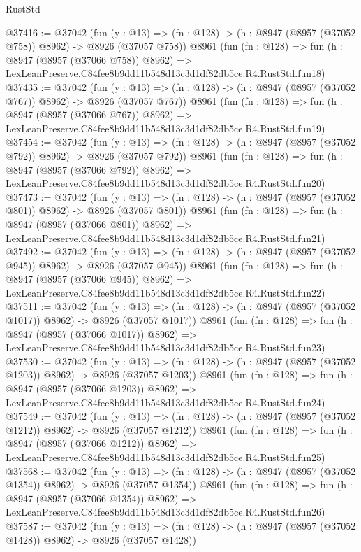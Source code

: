 \begin{lexlean}{RustStd}
\begin{coremodule}
@37416 := @37042
    (fun (y : @13) => (fn : @128) -> (h : @8947 (@8957 (@37052 @758)) @8962) -> @8926 (@37057 @758))
    @8961
    (fun (fn : @128) =>
    fun (h : @8947 (@8957 (@37066 @758)) @8962) =>
    LexLeanPreserve.C84fee8b9dd11b548d13c3d1df82db5ce.R4.RustStd.fun18)
@37435 := @37042
    (fun (y : @13) => (fn : @128) -> (h : @8947 (@8957 (@37052 @767)) @8962) -> @8926 (@37057 @767))
    @8961
    (fun (fn : @128) =>
    fun (h : @8947 (@8957 (@37066 @767)) @8962) =>
    LexLeanPreserve.C84fee8b9dd11b548d13c3d1df82db5ce.R4.RustStd.fun19)
@37454 := @37042
    (fun (y : @13) => (fn : @128) -> (h : @8947 (@8957 (@37052 @792)) @8962) -> @8926 (@37057 @792))
    @8961
    (fun (fn : @128) =>
    fun (h : @8947 (@8957 (@37066 @792)) @8962) =>
    LexLeanPreserve.C84fee8b9dd11b548d13c3d1df82db5ce.R4.RustStd.fun20)
@37473 := @37042
    (fun (y : @13) => (fn : @128) -> (h : @8947 (@8957 (@37052 @801)) @8962) -> @8926 (@37057 @801))
    @8961
    (fun (fn : @128) =>
    fun (h : @8947 (@8957 (@37066 @801)) @8962) =>
    LexLeanPreserve.C84fee8b9dd11b548d13c3d1df82db5ce.R4.RustStd.fun21)
@37492 := @37042
    (fun (y : @13) => (fn : @128) -> (h : @8947 (@8957 (@37052 @945)) @8962) -> @8926 (@37057 @945))
    @8961
    (fun (fn : @128) =>
    fun (h : @8947 (@8957 (@37066 @945)) @8962) =>
    LexLeanPreserve.C84fee8b9dd11b548d13c3d1df82db5ce.R4.RustStd.fun22)
@37511 := @37042
    (fun (y : @13) =>
    (fn : @128) -> (h : @8947 (@8957 (@37052 @1017)) @8962) -> @8926 (@37057 @1017))
    @8961
    (fun (fn : @128) =>
    fun (h : @8947 (@8957 (@37066 @1017)) @8962) =>
    LexLeanPreserve.C84fee8b9dd11b548d13c3d1df82db5ce.R4.RustStd.fun23)
@37530 := @37042
    (fun (y : @13) =>
    (fn : @128) -> (h : @8947 (@8957 (@37052 @1203)) @8962) -> @8926 (@37057 @1203))
    @8961
    (fun (fn : @128) =>
    fun (h : @8947 (@8957 (@37066 @1203)) @8962) =>
    LexLeanPreserve.C84fee8b9dd11b548d13c3d1df82db5ce.R4.RustStd.fun24)
@37549 := @37042
    (fun (y : @13) =>
    (fn : @128) -> (h : @8947 (@8957 (@37052 @1212)) @8962) -> @8926 (@37057 @1212))
    @8961
    (fun (fn : @128) =>
    fun (h : @8947 (@8957 (@37066 @1212)) @8962) =>
    LexLeanPreserve.C84fee8b9dd11b548d13c3d1df82db5ce.R4.RustStd.fun25)
@37568 := @37042
    (fun (y : @13) =>
    (fn : @128) -> (h : @8947 (@8957 (@37052 @1354)) @8962) -> @8926 (@37057 @1354))
    @8961
    (fun (fn : @128) =>
    fun (h : @8947 (@8957 (@37066 @1354)) @8962) =>
    LexLeanPreserve.C84fee8b9dd11b548d13c3d1df82db5ce.R4.RustStd.fun26)
@37587 := @37042
    (fun (y : @13) =>
    (fn : @128) -> (h : @8947 (@8957 (@37052 @1428)) @8962) -> @8926 (@37057 @1428))

\end{coremodule}
\end{lexlean}

